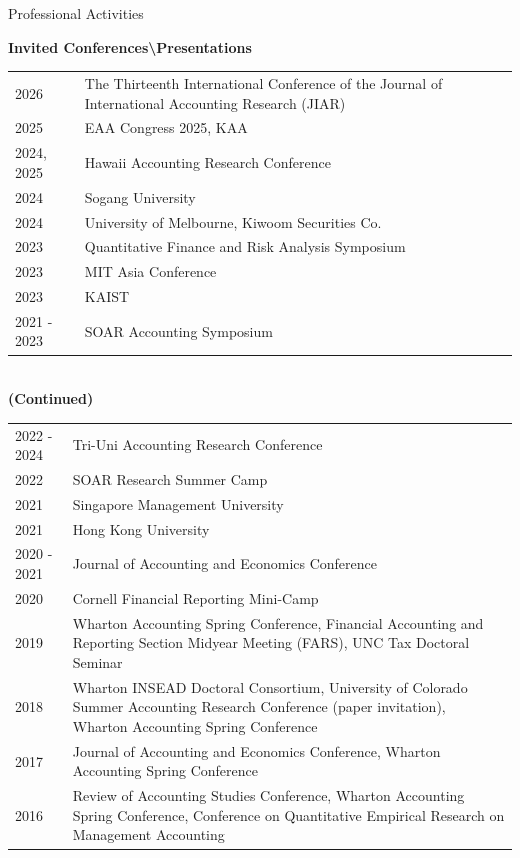 \documentclass{resume} %
\begin{document}
\begin{rSection}{Professional Activities}

{\bf Invited Conferences\textbackslash Presentations} \medskip \\
\begin{tabular}{p{2cm}p{15.5cm}}
2026 & The Thirteenth International Conference of the Journal of International Accounting Research (JIAR) \medskip \\
2025 & EAA Congress 2025, KAA  \medskip \\
2024, 2025 & Hawaii Accounting Research Conference  \medskip \\
2024 & Sogang University  \medskip \\
2024 & University of Melbourne, Kiwoom Securities Co. \medskip \\
2023 & Quantitative Finance and Risk Analysis Symposium \medskip \\
2023 & MIT Asia Conference \medskip \\
2023 & KAIST \medskip \\
2021 - 2023 & SOAR Accounting Symposium \medskip \\


\end{tabular} \\
{\bf (Continued)} \medskip \\
\begin{tabular}{p{2cm}p{15.5cm}}
2022 - 2024 & Tri-Uni Accounting Research Conference \medskip \\
2022 & SOAR Research Summer Camp \medskip \\
2021 & Singapore Management University \medskip \\
2021 & Hong Kong University \medskip \\
2020 - 2021 & Journal of Accounting and Economics Conference \medskip \\
2020 & Cornell Financial Reporting Mini-Camp \medskip \\
2019 & Wharton Accounting Spring Conference, Financial Accounting and Reporting Section Midyear Meeting (FARS), UNC Tax Doctoral Seminar \medskip \\
2018 & Wharton INSEAD Doctoral Consortium, University of Colorado Summer Accounting Research Conference (paper invitation), Wharton Accounting Spring Conference \medskip \\
2017 & Journal of Accounting and Economics Conference, Wharton Accounting Spring Conference  \medskip \\
2016 & Review of Accounting Studies Conference, Wharton Accounting Spring Conference, Conference on Quantitative Empirical Research on Management Accounting
\end{tabular}


\end{rSection}
\end{document}
